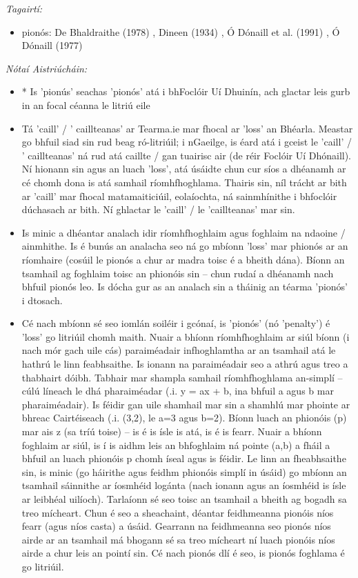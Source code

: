 \documentclass{article}
\begin{document}
 \noindent \textit{Tagairtí:}
\begin{itemize}
	\item pionós: De Bhaldraithe (1978) \cite{de-bhaldraithe}, Dineen (1934) \cite{dineen}, Ó Dónaill et al. (1991) \cite{focloir-beag}, Ó Dónaill (1977) \cite{odonaill}
\end{itemize}

 \noindent \textit{Nótaí Aistriúcháin:}
\begin{itemize}
	\item * Is 'pionús' seachas 'pionós' atá i bhFoclóir Uí Dhuinín, ach glactar leis gurb in an focal céanna le litriú eile
	\item Tá 'caill' / ' caillteanas' ar Tearma.ie mar fhocal ar 'loss' an Bhéarla. Meastar go bhfuil siad sin rud beag ró-litriúil; i nGaeilge, is éard atá i gceist le 'caill' / ' caillteanas' ná rud atá caillte / gan tuairisc air (de réir Foclóir Uí Dhónaill). Ní hionann sin agus an luach 'loss', atá úsáidte chun cur síos a dhéanamh ar cé chomh dona is atá samhail ríomhfhoghlama. Thairis sin, níl trácht ar bith ar 'caill' mar fhocal matamaiticiúil, eolaíochta, ná sainmhínithe i bhfoclóir dúchasach ar bith. Ní ghlactar le 'caill' / le 'caillteanas' mar sin.
	\item Is minic a dhéantar analach idir ríomhfhoghlaim agus foghlaim na ndaoine / ainmhithe. Is é bunús an analacha seo ná go mbíonn 'loss' mar phionós ar an ríomhaire (cosúil le pionós a chur ar madra toisc é a bheith dána). Bíonn an tsamhail ag foghlaim toisc an phionóis sin -- chun rudaí a dhéanamh nach bhfuil pionós leo. Is dócha gur as an analach sin a tháinig an téarma 'pionós' i dtosach.
	\item Cé nach mbíonn sé seo iomlán soiléir i gcónaí, is 'pionós' (nó 'penalty') é 'loss' go litriúil chomh maith. Nuair a bhíonn ríomhfhoghlaim ar siúl bíonn (i nach mór gach uile cás) paraiméadair infhoghlamtha ar an tsamhail atá le hathrú le linn feabhsaithe. Is ionann na paraiméadair seo a athrú agus treo a thabhairt dóibh. Tabhair mar shampla samhail ríomhfhoghlama an-simplí -- cúlú líneach le dhá pharaiméadar (.i. y = ax + b, ina bhfuil a agus b mar pharaiméadair). Is féidir gan uile shamhail mar sin a shamhlú mar phointe ar bhreac Cairtéiseach (.i. (3,2), le a=3 agus b=2). Bíonn luach an phionóis (p) mar ais z (sa tríú toise) -- is é is ísle is atá, is é is fearr. Nuair a bhíonn foghlaim ar siúl, is í is aidhm leis an bhfoghlaim ná pointe (a,b) a fháil a bhfuil an luach phionóis p chomh íseal agus is féidir. Le linn an fheabhsaithe sin, is minic (go háirithe agus feidhm phionóis simplí in úsáid) go mbíonn an tsamhail sáinnithe ar íosmhéid logánta (nach ionann agus an íosmhéid is ísle ar leibhéal uilíoch). Tarlaíonn sé seo toisc an tsamhail a bheith ag bogadh sa treo mícheart. Chun é seo a sheachaint, déantar feidhmeanna pionóis níos fearr (agus níos casta) a úsáid. Gearrann na feidhmeanna seo pionós níos airde ar an tsamhail má bhogann sé sa treo mícheart ní luach pionóis níos airde a chur leis an pointí sin. Cé nach pionós dlí é seo, is pionós foghlama é go litriúil.

\end{itemize}
\end{document}

